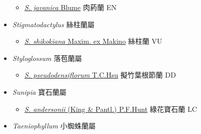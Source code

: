 \begin{itemize}
  \begin{itemize}
        \item[] \href{http://www.theplantlist.org/tpl1.1/search?q=Stereosandra+javanica}{\textit{S. javanica} Blume}   肉葯蘭   EN
  \end{itemize}
 \item[] \textit{Stigmatodactylus} 絲柱蘭屬
                                
  \begin{itemize}
        \item[] \href{http://www.theplantlist.org/tpl1.1/search?q=Stigmatodactylus+shikokiana}{\textit{S. shikokiana} Maxim. ex Makino}   絲柱蘭   VU
  \end{itemize}
 \item[] \textit{Styloglossum} 落苞蘭屬
                                
  \begin{itemize}
        \item[] \href{http://www.theplantlist.org/tpl1.1/search?q=Styloglossum+pseudodensiflorum}{\textit{S. pseudodensiflorum} T.C.Hsu}   擬竹葉根節蘭   DD
  \end{itemize}
 \item[] \textit{Sunipia} 寶石蘭屬
                                
  \begin{itemize}
        \item[] \href{http://www.theplantlist.org/tpl1.1/search?q=Sunipia+andersonii}{\textit{S. andersonii} (King \& Pantl.) P.F.Hunt}   綠花寶石蘭   LC
  \end{itemize}
 \item[] \textit{Taeniophyllum} 小蜘蛛蘭屬
                                

\end{itemize}
